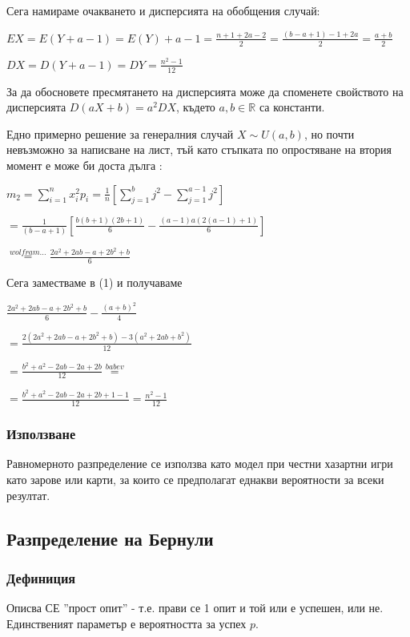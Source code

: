 \documentclass[fleqn,12pt]{article}
\begin{document}
\begin{justify}
\vspace{10pt}
Сега намираме очакването и дисперсията на обобщения случай:

$EX = E(Y+a-1) = E(Y) + a - 1 = \frac{n + 1 + 2a - 2}{2} = \frac{(b-a+1) -1 +2a}{2} = \frac{a+b}{2}$

\vspace{10pt}

$DX = D(Y+a-1) = DY = \frac{n^2 - 1}{12}$

За да обосновете  пресмятането на дисперсията може да споменете свойството на дисперсията $D(aX + b) = a^2DX$, 
където $a,b \in \mathbb{R}$ са константи.

\vspace{10pt}
Едно примерно решение за генералния случай $X \sim U(a, b)$, но почти невъзможно за написване на лист, тъй като
стъпката по опростяване на втория момент е може би доста дълга : 

$m_2 = \sum_{i=1}^n x_i^2 p_i = \frac{1}{n} [\sum_{j=1}^b j^2  - \sum_{j=1}^{a-1} j^2 ]$ 

$ = \frac{1}{(b-a+1)} [\frac{b(b+1)(2b+1)}{6} - \frac{(a-1)a(2(a-1)+1)}{6}]$

$\overset{wolfram \dots}{=} \frac{2a^2 + 2ab - a + 2b^2 + b}{6}$

Сега заместваме в (1) и получаваме 

$\frac{2a^2 + 2ab - a + 2b^2 + b}{6} - \frac{(a+b)^2}{4}$

$ = \frac{2(2a^2 + 2ab - a + 2b^2 + b) - 3(a^2 + 2ab + b^2)}{12}$

$ = \frac{b^2 + a^2 -2ab -2a + 2b}{12} \overset{babev}{=} $

$ = \frac{b^2 + a^2 -2ab -2a + 2b + 1 - 1}{12} = \frac{n^2 - 1}{12}$ 
\subsubsection{Използване}
Равномерното разпределение се използва като модел при честни хазартни игри като зарове или карти, за които се
предполагат еднакви вероятности за всеки резултат.

\subsection{Разпределение на Бернули}
\subsubsection{Дефиниция} 
Описва СЕ ''прост опит'' - т.е. прави се 1 опит и той или е успешен, или не. Единственият параметър е 
вероятността за успех $p$.


\end{justify}
\end{document}
